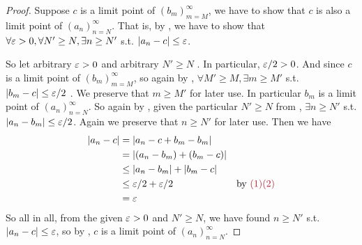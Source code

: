 \begin{proof}
Suppose \(c\) is a limit point of \((b_m)_{m = M}^{\infty}\), we have to show that \(c\) is also a limit point of \((a_n)_{n = N}^{\infty}\).
That is, by , we have to show that \(\forall \varepsilon > 0, \forall N' \ge N, \exists n \ge N'\) s.t. \(\lvert a_n - c\rvert \le \varepsilon\).

So let arbitrary \(\varepsilon > 0\) and arbitrary \(N' \ge N\) .
In particular, \(\varepsilon/2 > 0\).
And since \(c\) is a limit point of \((b_m)_{m = M}^{\infty}\), so again by , \(\forall M' \ge M, \exists m \ge M'\) s.t. \(\lvert b_m - c\rvert \le \varepsilon/2\) .
We preserve that \(m \ge M'\) for later use.
In particular \(b_m\) is a limit point of \((a_n)_{n = N}^{\infty}\).
So again by , given the particular \(N' \ge N\) from , \(\exists n \ge N'\) s.t. \(\lvert a_n - b_m\rvert \le \varepsilon/2\). 
Again we preserve that \(n \ge N'\) for later use.
Then we have
\begin{align*}
    \abs{a_n - c} & = \abs{a_n - c + b_m - b_m} \\
                  & = \abs{(a_n - b_m) + (b_m - c)} \\
                  & \le \abs{a_n - b_m} + \abs{b_m - c} \\
                  & \le \varE/2 + \varE/2 & \text{by \MAROON{(1)(2)}} \\
                  & = \varE
\end{align*}
So all in all, from the given \(\varepsilon > 0\) and \(N' \ge N\), we have found \(n \ge N'\) s.t. \(\lvert a_n - c\rvert \le \varepsilon\), so by , \(c\) is a limit point of \((a_n)_{n = N}^{\infty}\).
\end{proof}
